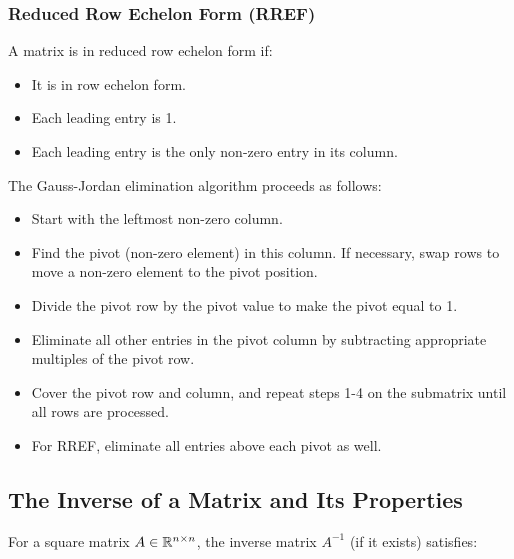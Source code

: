 \subsubsection{Reduced Row Echelon Form (RREF)}

A matrix is in reduced row echelon form if:

\begin{itemize}

    \item It is in row echelon form.

    \item Each leading entry is 1.

    \item Each leading entry is the only non-zero entry in its column.

\end{itemize}

The Gauss-Jordan elimination algorithm proceeds as follows:

\begin{itemize}

    \item Start with the leftmost non-zero column.

    \item Find the pivot (non-zero element) in this column. If necessary, swap rows to move a non-zero element to the pivot position.

    \item Divide the pivot row by the pivot value to make the pivot equal to 1.

    \item Eliminate all other entries in the pivot column by subtracting appropriate multiples of the pivot row.

    \item Cover the pivot row and column, and repeat steps 1-4 on the submatrix until all rows are processed.

    \item For RREF, eliminate all entries above each pivot as well.

\end{itemize}

\subsection{The Inverse of a Matrix and Its Properties}

For a square matrix \(A \in \mathbb{R}^{n \times n}\), the inverse matrix \(A^{-1}\) (if it exists) satisfies:

